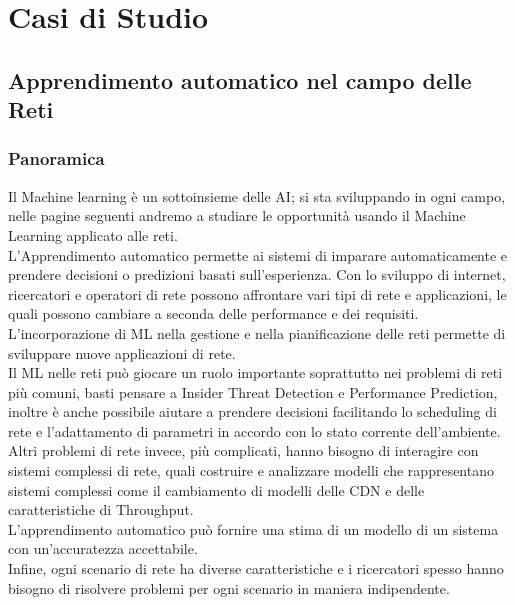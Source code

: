 \documentclass[../tesi.tex]{subfiles}
\begin{document}
\chapter{Casi di Studio}
\section{Apprendimento automatico nel campo delle Reti}



\subsection{Panoramica}

Il Machine learning è un sottoinsieme delle AI; si sta sviluppando in ogni campo, nelle pagine seguenti andremo a studiare le opportunità usando il Machine Learning applicato alle reti.\\
L'Apprendimento automatico permette ai sistemi di imparare automaticamente e prendere decisioni o predizioni basati sull’esperienza.
Con lo sviluppo di internet, ricercatori e operatori di rete possono affrontare vari tipi di rete e applicazioni, le quali possono cambiare a seconda delle performance e dei requisiti.\\
L’incorporazione di ML nella gestione e nella pianificazione delle reti permette di sviluppare nuove applicazioni di rete.\\
Il ML nelle reti può giocare un ruolo importante soprattutto nei problemi di reti più comuni, basti pensare a Insider Threat Detection e Performance Prediction, inoltre è anche possibile aiutare a prendere decisioni facilitando lo scheduling di rete e l’adattamento di parametri in accordo con lo stato corrente dell’ambiente.\\
Altri problemi di rete invece, più complicati, hanno bisogno di interagire con sistemi complessi di rete, quali costruire e analizzare modelli che rappresentano sistemi complessi come il cambiamento di modelli delle \Gls{CDN} e delle caratteristiche di \Gls{Throughput}.\\
L'apprendimento automatico può fornire una stima di un modello di un sistema con un’accuratezza accettabile.\\
Infine, ogni scenario di rete ha diverse caratteristiche e i ricercatori spesso hanno bisogno di risolvere problemi per ogni scenario in maniera indipendente.
\end{document}
